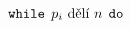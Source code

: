 \documentclass[preview]{standalone}
\begin{document}
\begin{align*}
&\hspace*{12pt}\mathtt{while} \:\: p_i \text{ dělí } n \:\: \mathtt{do}\\
\end{align*}
\end{document}
